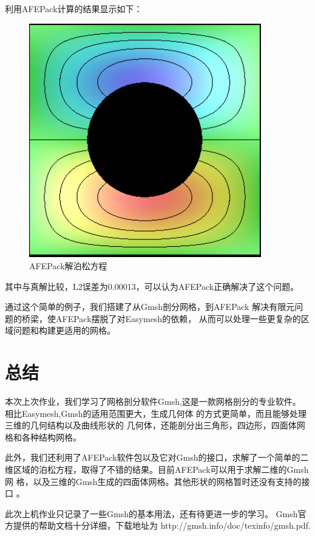 \documentclass[a4paper,  11pt]{ctexart}
\begin{document}
利用AFEPack计算的结果显示如下：
\begin{figure}[H]
	\begin{center}
		\includegraphics[width=0.9\textwidth]{result.png}
	\end{center}
	\caption{AFEPack解泊松方程}
\end{figure}
其中与真解比较，L2误差为0.00013，可以认为AFEPack正确解决了这个问题。

通过这个简单的例子，我们搭建了从Gmsh剖分网格，到AFEPack
解决有限元问题的桥梁，使AFEPack摆脱了对Easymesh的依赖，
从而可以处理一些更复杂的区域问题和构建更适用的网格。
\newpage
\section{总结}
本次上次作业，我们学习了网格剖分软件Gmsh,这是一款网格剖分的专业软件。
相比Easymesh,Gmsh的适用范围更大，生成几何体
的方式更简单，而且能够处理三维的几何结构以及曲线形状的
几何体，还能剖分出三角形，四边形，四面体网格和各种结构网格。

此外，我们还利用了AFEPack软件包以及它对Gmsh的接口，求解了一个简单的二
维区域的泊松方程，取得了不错的结果。目前AFEPack可以用于求解二维的Gmsh网
格，以及三维的Gmsh生成的四面体网格。其他形状的网格暂时还没有支持的接口
。

此次上机作业只记录了一些Gmsh的基本用法，还有待更进一步的学习。
Gmsh官方提供的帮助文档十分详细，下载地址为
http://gmsh.info/doc/texinfo/gmsh.pdf. 
\end{document}
